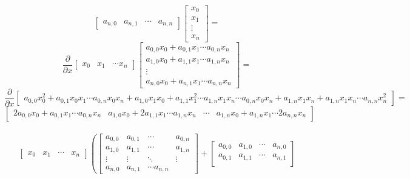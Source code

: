 \begin{itemize}
{\[\begin{bmatrix}
            a_{n,0} & a_{n,1} & \cdots & a_{n,n}
        \end{bmatrix}
        \begin{bmatrix}
            x_0 \\ x_1 \\ \vdots\\ x_n
        \end{bmatrix}
        =
    \]
    \[
        \frac{\partial}{\partial x}
        \begin{bmatrix}
            x_0 & x_1 & \cdots x_n
        \end{bmatrix}
        \begin{bmatrix}
            a_{0,0}x_0 + a_{0,1}x_1 \cdots a_{0,n}x_n \\
            a_{1,0}x_0 + a_{1,1}x_1 \cdots a_{1,n}x_n \\
            \vdots \\
            a_{n,0}x_0 + a_{n,1}x_1 \cdots a_{n,n}x_n
        \end{bmatrix}
        =
    \]
    \[
        \frac{\partial}{\partial x}
        \begin{bmatrix}
            a_{0,0}x_0^2 + a_{0,1}x_0x_1 \cdots a_{0,n}x_0x_n + a_{1,0}x_1x_0 + a_{1,1}x_1^2 \cdots a_{1,n}x_1x_n \cdots a_{0,n}x_0x_n + a_{1,n}x_1x_n + a_{1,n}x_1x_n \cdots a_{n,n}x_n^2
        \end{bmatrix}
        =
    \]
    \[
    \begin{bmatrix} 
        2a_{0,0}x_0 + a_{0,1}x_1 \cdots a_{0,n}x_n &
        a_{1,0}x_0 + 2a_{1,1}x_1 \cdots a_{1,n}x_n &
        \cdots &
        a_{1,n}x_0 + a_{1,n}x_1 \cdots 2a_{n,n}x_n
    \end{bmatrix}
    \]\\
    \[
        \begin{bmatrix}
            x_0 & x_1 & \cdots & x_n
        \end{bmatrix}
        \left(
        \begin{bmatrix}
            a_{0,0} & a_{0,1} & \cdots & a_{0,n} \\
            a_{1,0} & a_{1,1} & \cdots & a_{1,n} \\
            \vdots & \vdots & \ddots & \vdots \\
            a_{n,0} & a_{n,1} & \cdots a_{n,n}
        \end{bmatrix}
        +
        \begin{bmatrix}
            a_{0,0} & a_{1,0} & \cdots & a_{n,0} \\
            a_{0,1} & a_{1,1} & \cdots & a_{n,1} \\

\end{bmatrix}\]}
\end{itemize}
